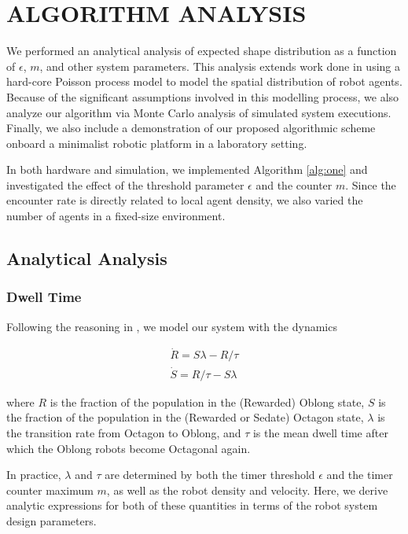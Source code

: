 \documentclass[runningheads]{llncs}
\begin{document}
\section{ALGORITHM ANALYSIS} \label{sec:analysis}

We performed an analytical analysis of expected shape distribution as a function of $\epsilon$, $m$, and other system parameters. This analysis extends work done in \cite{mayya2018localization} using a hard-core Poisson process model to model the spatial distribution of robot agents. Because of the significant assumptions involved in this modelling process, we also analyze our algorithm via Monte Carlo analysis of simulated system executions. Finally, we also include a demonstration of our proposed algorithmic scheme onboard a minimalist robotic platform in a laboratory setting.

In both hardware and simulation, we implemented Algorithm \ref{alg:one} and investigated the effect of the threshold parameter $\epsilon$ and the counter $m$. Since the encounter rate is directly related to local agent density, we also varied the number of agents in a fixed-size environment.

\subsection{Analytical Analysis}

\subsubsection{Dwell Time}

 Following the reasoning in \cite{pavlic2021quorum}, we model our system with the dynamics

 \begin{align}
     \dot{R} = S \lambda - R/\tau \\
     \dot{S} = R/\tau - S \lambda
 \end{align}

  where $R$ is the fraction of the population in the (Rewarded) Oblong state, $S$ is the fraction of the population in the (Rewarded or Sedate) Octagon state, $\lambda$ is the transition rate from Octagon to Oblong, and $\tau$ is the mean dwell time after which the Oblong robots become Octagonal again.
  
  In practice, $\lambda$ and $\tau$ are determined by both the timer threshold $\epsilon$ and the timer counter maximum $m$, as well as the robot density and velocity. Here, we derive analytic expressions for both of these quantities in terms of the robot system design parameters.
\end{document}

